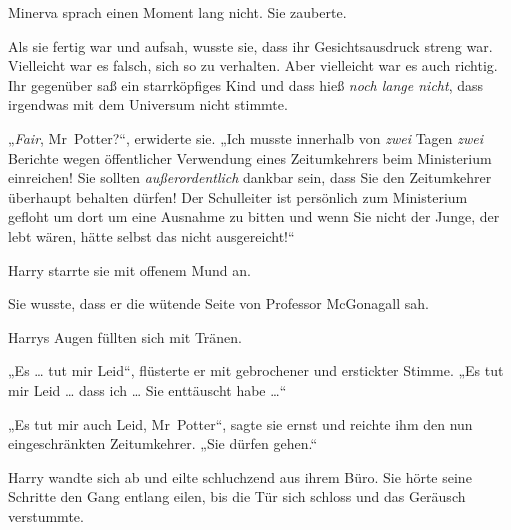Minerva sprach einen Moment lang nicht. Sie zauberte. 

Als sie fertig war und aufsah, wusste sie, dass ihr Gesichtsausdruck streng war. Vielleicht war es falsch, sich so zu verhalten. Aber vielleicht war es auch richtig. Ihr gegenüber saß ein starrköpfiges Kind und dass hieß \emph{noch lange nicht}, dass irgendwas mit dem Universum nicht stimmte. 

„\emph{Fair}, Mr~Potter?“, erwiderte sie. „Ich musste innerhalb von \emph{zwei} Tagen \emph{zwei} Berichte wegen öffentlicher Verwendung eines Zeitumkehrers beim Ministerium einreichen! Sie sollten \emph{außerordentlich} dankbar sein, dass Sie den Zeitumkehrer überhaupt behalten dürfen! Der Schulleiter ist persönlich zum Ministerium gefloht um dort um eine Ausnahme zu bitten und wenn Sie nicht der Junge, der lebt wären, hätte selbst das nicht ausgereicht!“ 

Harry starrte sie mit offenem Mund an. 

Sie wusste, dass er die wütende Seite von Professor McGonagall sah. 

Harrys Augen füllten sich mit Tränen. 

„Es … tut mir Leid“, flüsterte er mit gebrochener und erstickter Stimme. „Es tut mir Leid … dass ich … Sie enttäuscht habe …“ 

„Es tut mir auch Leid, Mr~Potter“, sagte sie ernst und reichte ihm den nun eingeschränkten Zeitumkehrer. „Sie dürfen gehen.“ 

Harry wandte sich ab und eilte schluchzend aus ihrem Büro. Sie hörte seine Schritte den Gang entlang eilen, bis die Tür sich schloss und das Geräusch verstummte. 

